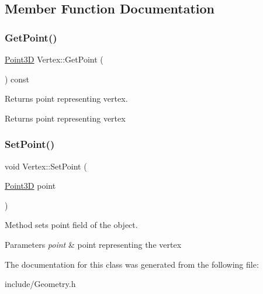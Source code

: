 \subsection{Member Function Documentation}
\hypertarget{class_vertex_a737ca423a44989a7dfc5ffa92e890781}{}\label{class_vertex_a737ca423a44989a7dfc5ffa92e890781} 
\subsubsection{\texorpdfstring{Get\+Point()}{GetPoint()}}
{\footnotesize\ttfamily \hyperlink{class_point3_d}{Point3D} Vertex\+::\+Get\+Point (\begin{DoxyParamCaption}{ }\end{DoxyParamCaption}) const}

Returns point representing vertex. \begin{DoxyReturn}{Returns}
point representing vertex 
\end{DoxyReturn}
\hypertarget{class_vertex_afe14654ec1e3303294c53f4ed2a534f1}{}\label{class_vertex_afe14654ec1e3303294c53f4ed2a534f1} 
\subsubsection{\texorpdfstring{Set\+Point()}{SetPoint()}}
{\footnotesize\ttfamily void Vertex\+::\+Set\+Point (\begin{DoxyParamCaption}\item[{\hyperlink{class_point3_d}{Point3D}}]{point }\end{DoxyParamCaption})}

Method sets point field of the object. 
\begin{DoxyParams}{Parameters}
{\em point} & point representing the vertex \\
\hline
\end{DoxyParams}


The documentation for this class was generated from the following file\+:\begin{DoxyCompactItemize}
\item 
include/Geometry.\+h\end{DoxyCompactItemize}

